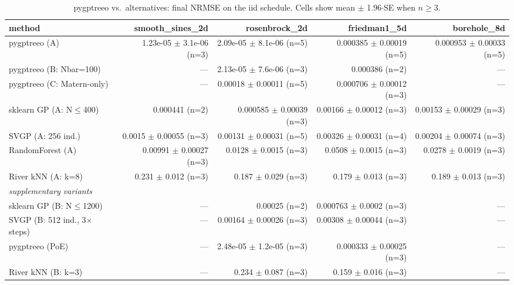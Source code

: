 
\begin{table}[h]
\centering
\caption{pygptreeo vs.\ alternatives: final NRMSE on the iid schedule. Cells show mean $\pm$ 1.96$\cdot$SE when $n\geq 3$.}
\begin{tabular}{lrrrr}
\toprule
method & smooth\_sines\_2d & rosenbrock\_2d & friedman1\_5d & borehole\_8d \\
\midrule
pygptreeo (A) & 1.23e-05 $\pm$ 3.1e-06 (n=3) & 2.09e-05 $\pm$ 8.1e-06 (n=5) & 0.000385 $\pm$ 0.00019 (n=5) & 0.000953 $\pm$ 0.00033 (n=5) \\
pygptreeo (B: Nbar=100) & --- & 2.13e-05 $\pm$ 7.6e-06 (n=3) & 0.000386 (n=2) & --- \\
pygptreeo (C: Matern-only) & --- & 0.00018 $\pm$ 0.00011 (n=5) & 0.000706 $\pm$ 0.00012 (n=3) & --- \\
sklearn GP (A: N$\leq$400) & 0.000441 (n=2) & 0.000585 $\pm$ 0.00039 (n=3) & 0.00166 $\pm$ 0.00012 (n=3) & 0.00153 $\pm$ 0.00029 (n=3) \\
SVGP (A: 256 ind.) & 0.0015 $\pm$ 0.00055 (n=3) & 0.00131 $\pm$ 0.00031 (n=5) & 0.00326 $\pm$ 0.00031 (n=4) & 0.00204 $\pm$ 0.00074 (n=3) \\
RandomForest (A) & 0.00991 $\pm$ 0.00027 (n=3) & 0.0128 $\pm$ 0.0015 (n=3) & 0.0508 $\pm$ 0.0015 (n=3) & 0.0278 $\pm$ 0.0019 (n=3) \\
River kNN (A: k=8) & 0.231 $\pm$ 0.012 (n=3) & 0.187 $\pm$ 0.029 (n=3) & 0.179 $\pm$ 0.013 (n=3) & 0.189 $\pm$ 0.013 (n=3) \\
\midrule
\multicolumn{5}{l}{\textit{supplementary variants}} \\
sklearn GP (B: N$\leq$1200) & --- & 0.00025 (n=2) & 0.000763 $\pm$ 0.0002 (n=3) & --- \\
SVGP (B: 512 ind., 3$\times$ steps) & --- & 0.00164 $\pm$ 0.00026 (n=3) & 0.00308 $\pm$ 0.00044 (n=3) & --- \\
pygptreeo (PoE) & --- & 2.48e-05 $\pm$ 1.2e-05 (n=3) & 0.000333 $\pm$ 0.00025 (n=3) & --- \\
River kNN (B: k=3) & --- & 0.234 $\pm$ 0.087 (n=3) & 0.159 $\pm$ 0.016 (n=3) & --- \\
\bottomrule
\end{tabular}
\end{table}

